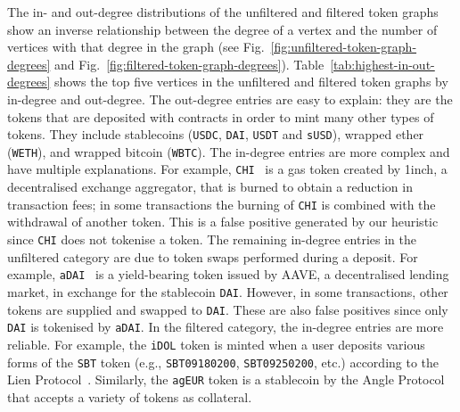 The in- and out-degree distributions of the unfiltered and filtered
token graphs show an inverse relationship between the degree of a
vertex and the number of vertices with that degree in the graph (see
Fig.~\ref{fig:unfiltered-token-graph-degrees} and
Fig.~\ref{fig:filtered-token-graph-degrees}).
Table~\ref{tab:highest-in-out-degrees} shows the top five vertices in
the unfiltered and filtered token graphs by in-degree and out-degree.
The out-degree entries are easy to explain: they are the tokens that
are deposited with contracts in order to mint many other types of
tokens.  They include stablecoins (\texttt{USDC}, \texttt{DAI},
\texttt{USDT} and \texttt{sUSD}), wrapped ether (\texttt{WETH}), and
wrapped bitcoin (\texttt{WBTC}).  The in-degree entries are more
complex and have multiple explanations.  For example,
\texttt{CHI}~\cite{1inch-20} is a gas token created by 1inch, a
decentralised exchange aggregator, that is burned to obtain a
reduction in transaction fees; in some transactions the burning of
\texttt{CHI} is combined with the withdrawal of another token.  This
is a false positive generated by our heuristic since \texttt{CHI} does
not tokenise a token.  The remaining in-degree entries in the
unfiltered category are due to token swaps performed during a deposit.
For example, \texttt{aDAI}~\cite{aave-xx} is a yield-bearing token
issued by AAVE, a decentralised lending market, in exchange for the
stablecoin \texttt{DAI}.  However, in some transactions, other tokens
are supplied and swapped to \texttt{DAI}.  These are also false
positives since only \texttt{DAI} is tokenised by \texttt{aDAI}.  In
the filtered category, the in-degree entries are more reliable.  For
example, the \texttt{iDOL} token is minted when a user deposits
various forms of the \texttt{SBT} token (e.g., \texttt{SBT09180200},
\texttt{SBT09250200}, etc.) according to the Lien
Protocol~\cite{lien-20}.  Similarly, the \texttt{agEUR} token is a
stablecoin by the Angle Protocol~\cite{angle-21} that accepts a
variety of tokens as collateral.

